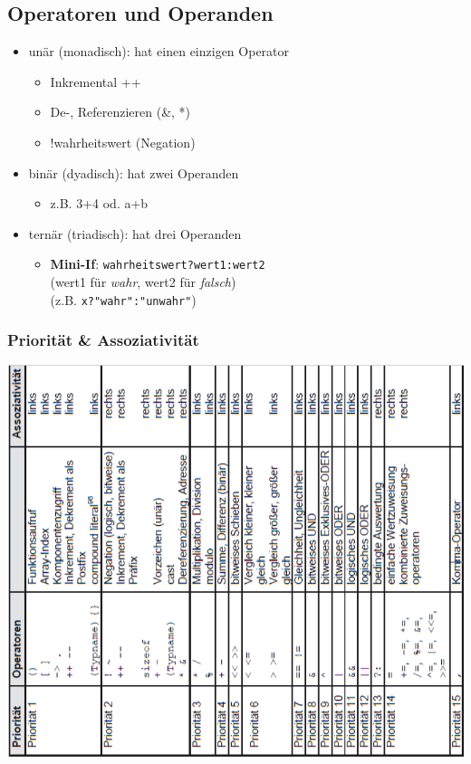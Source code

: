 	\subsection{Operatoren und Operanden}
		\begin{itemize}
			\item unär (monadisch): hat einen einzigen Operator
			\begin{itemize}
				\item Inkremental ++
				\item De-, Referenzieren (\&, *)
				\item !wahrheitswert (Negation)
			\end{itemize}
			\item binär (dyadisch): hat zwei Operanden
			\begin{itemize}
				\item z.B. 3+4 od. a+b
			\end{itemize}
			\item ternär (triadisch): hat drei Operanden
			\begin{itemize}
				\item \textbf{Mini-If}: \verb|wahrheitswert?wert1:wert2|\\
				(wert1 für \textit{wahr}, wert2 für \textit{falsch}) \\
				(z.B. \verb|x?"wahr":"unwahr"|)
			\end{itemize}
		\end{itemize}

		\subsubsection{Priorität \& Assoziativität}
			\begin{minipage}{0.8\linewidth}
					\includegraphics[width=1\linewidth]{Bilder/operatoren_prio.png}
			\end{minipage}
			
